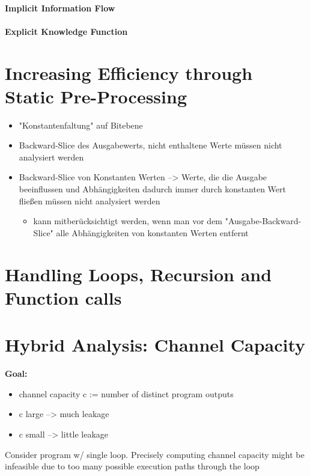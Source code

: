 \paragraph{Implicit Information Flow}


\paragraph{Explicit Knowledge Function}


\section{Increasing Efficiency through Static Pre-Processing}
\begin{itemize}
    \item "Konstantenfaltung" auf Bitebene
    \item Backward-Slice des Ausgabewerts, nicht enthaltene Werte müssen nicht analysiert werden
    \item Backward-Slice von Konstanten Werten --> Werte, die die Ausgabe beeinflussen und Abhängigkeiten dadurch immer durch konstanten Wert fließen müssen nicht analysiert werden
\begin{itemize}
    \item kann mitberücksichtigt werden, wenn man vor dem "Ausgabe-Backward-Slice" alle Abhängigkeiten von konstanten Werten entfernt 
\end{itemize}
\end{itemize}

\section{Handling Loops, Recursion and Function calls}

\section{Hybrid Analysis: Channel Capacity}
\textbf{Goal:}
\begin{itemize}
    \item channel capacity c := number of distinct program outputs
    \item c large --> much leakage
    \item c small --> little leakage
\end{itemize}
Consider program w/ single loop. Precisely computing channel capacity might be infeasible due to too many possible execution paths through the loop

